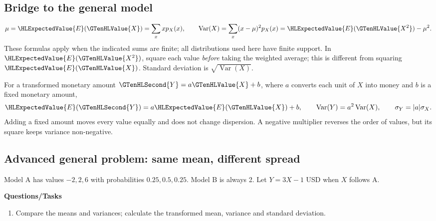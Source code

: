 \subsection{Bridge to the general model}
\[
\mu=\HLExpectedValue{E}(\GTenHLValue{X})=\sum_xxp_X(x),\qquad
\operatorname{Var}(X)=\sum_x(x-\mu)^2p_X(x)=\HLExpectedValue{E}(\GTenHLValue{X^2})-\mu^2.
\]
These formulas apply when the indicated sums are finite; all distributions used here have finite support. In $\HLExpectedValue{E}(\GTenHLValue{X^2})$, square each value \emph{before} taking the weighted average; this is different from squaring $\HLExpectedValue{E}(\GTenHLValue{X})$. Standard deviation is $\sqrt{\operatorname{Var}(X)}$.

For a transformed monetary amount $\GTenHLSecond{Y}=a\GTenHLValue{X}+b$, where $a$ converts each unit of $X$ into money and $b$ is a fixed monetary amount,
\[\HLExpectedValue{E}(\GTenHLSecond{Y})=a\HLExpectedValue{E}(\GTenHLValue{X})+b,\qquad \operatorname{Var}(Y)=a^2\operatorname{Var}(X),\qquad \sigma_Y=|a|\sigma_X.\]
Adding a fixed amount moves every value equally and does not change dispersion. A negative multiplier reverses the order of values, but its square keeps variance non-negative.
\subsection{Advanced general problem: same mean, different spread}\label{ex:c8-spread}
Model A has values $-2,2,6$ with probabilities $0.25,0.5,0.25$. Model B is always 2. Let $Y=3X-1$ USD when $X$ follows A.

\textbf{Questions/Tasks}
\begin{enumerate}
\item Compare the means and variances; calculate the transformed mean, variance and standard deviation.
\end{enumerate}
